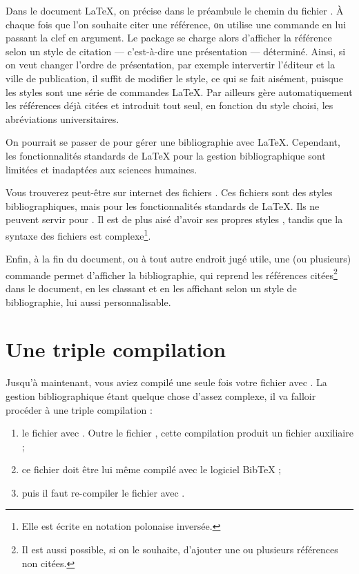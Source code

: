 Dans le document \LaTeX{}, on précise dans le préambule le chemin du fichier . À chaque fois que l'on souhaite citer une référence, οn utilise une commande en lui passant la clef en argument. Le package  se charge alors d'afficher la référence selon un style de citation --- c’est-à-dire une présentation --- déterminé. Ainsi, si on veut changer l'ordre de présentation, par exemple intervertir l'éditeur et la ville de publication, il suffit de modifier le style, ce qui se fait aisément, puisque les styles sont une série de commandes \LaTeX{}. Par ailleurs  gère automatiquement les références déjà citées et introduit tout seul, en fonction du style choisi, les abréviations universitaires. 

\begin{plusloins}
On pourrait se passer de   pour gérer une bibliographie avec \LaTeX{}. Cependant, les fonctionnalités standards de \LaTeX{} pour la gestion bibliographique sont limitées et inadaptées aux sciences humaines. 

Vous trouverez peut-être sur internet des fichiers . Ces fichiers sont des styles bibliographiques, mais pour les fonctionnalités standards de \LaTeX{}. Ils ne peuvent servir pour . Il est de plus aisé d'avoir ses propres styles , tandis que la syntaxe des fichiers  est complexe\footnote{Elle est écrite en notation polonaise inversée.}.
\end{plusloins}

Enfin, à la fin du document, ou à tout autre endroit jugé utile, une (ou plusieurs) commande permet d'afficher la bibliographie, qui reprend les références citées\footnote{Il est aussi possible, si on le souhaite, d'ajouter une ou plusieurs références non citées.} dans le document, en les classant et en les affichant selon un style de bibliographie, lui aussi personnalisable.

\section{Une triple compilation}\label{3compil}

Jusqu'à maintenant, vous aviez compilé une seule fois votre fichier  avec \XeLaTeX. La gestion bibliographique étant quelque chose d'assez complexe, il va falloir procéder à une triple compilation :
\begin{enumerate}
\item le fichier  avec \XeLaTeX. Outre le fichier , cette compilation produit un fichier auxiliaire  ;
\item ce fichier doit être lui même compilé avec le logiciel BibTeX ;
\item puis il faut re-compiler le fichier  avec \XeLaTeX.
\end{enumerate}

